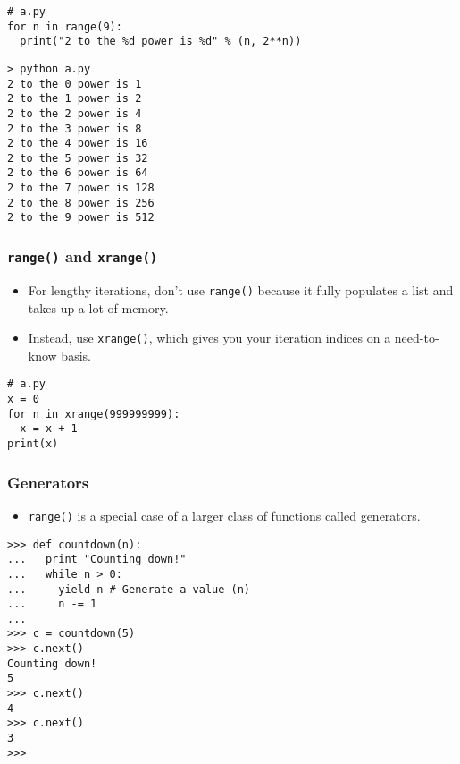 \documentclass[handout]{beamer}
\numberwithin{equation}{section}
\begin{document}
\begin{frame}[fragile]
\frametitle{}

\begin{lstlisting}[name=ex]
# a.py
for n in range(9):
  print("2 to the %d power is %d" % (n, 2**n))
\end{lstlisting}

\pause

\begin{lstlisting}[name=ex]
> python a.py
2 to the 0 power is 1
2 to the 1 power is 2
2 to the 2 power is 4
2 to the 3 power is 8
2 to the 4 power is 16
2 to the 5 power is 32
2 to the 6 power is 64
2 to the 7 power is 128
2 to the 8 power is 256
2 to the 9 power is 512
\end{lstlisting}
\end{frame}



\begin{frame}[fragile]
\frametitle{{\tt range()} and {\tt xrange()}}

\begin{itemize}
\item For lengthy iterations, don't use {\tt range()} because it fully populates a list and takes up a lot of memory.
\pause \item  Instead, use {\tt xrange()}, which gives you your iteration indices on a need-to-know basis.
\end{itemize}

\pause \begin{lstlisting}[name=ex]
# a.py
x = 0
for n in xrange(999999999):
  x = x + 1
print(x)
\end{lstlisting}
\end{frame}



\begin{frame}[fragile]
\frametitle{Generators}

\begin{itemize}
\item {\tt range()} is a special case of a larger class of functions called generators.
\end{itemize}

\begin{lstlisting}[name=ex]
>>> def countdown(n):
...   print "Counting down!" 
...   while n > 0:
...     yield n # Generate a value (n) 
...     n -= 1
... 
>>> c = countdown(5)
>>> c.next()
Counting down!
5
>>> c.next()
4
>>> c.next()
3
>>> 
\end{lstlisting}
\end{frame}
\end{document}
